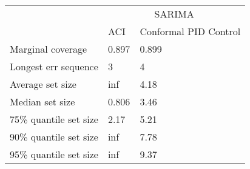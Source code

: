 \begin{tabular}{lll}
\toprule
& \multicolumn{2}{c}{SARIMA} \\
& ACI & Conformal PID Control \\
\midrule
Marginal coverage & 0.897 & 0.899 \\
Longest err sequence & 3 & 4 \\
Average set size & inf & 4.18 \\
Median set size & 0.806 & 3.46 \\
75\% quantile set size & 2.17 & 5.21 \\
90\% quantile set size & inf & 7.78 \\
95\% quantile set size & inf & 9.37 \\
\bottomrule
\end{tabular}
